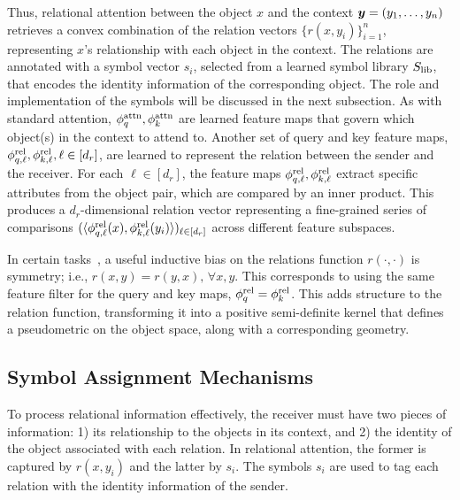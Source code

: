 
Thus, relational attention between the object $x$ and the context $\bm{y} = (y_1, \ldots, y_n)$ retrieves a convex combination of the relation vectors $\{r(x, y_i)\}_{i=1}^{n}$, representing $x$'s relationship with each object in the context. The relations are annotated with a symbol vector $s_i$, selected from a learned symbol library $S_\mathrm{lib}$, that encodes the identity information of the corresponding object. The role and implementation of the symbols will be discussed in the next subsection. As with standard attention, $\phi_q^{\mathrm{attn}}, \phi_k^{\mathrm{attn}}$ are learned feature maps that govern which object(s) in the context to attend to. Another set of query and key feature maps, $\phi_{q, \ell}^{\mathrm{rel}}, \phi_{k, \ell}^{\mathrm{rel}}, \ell \in [d_r]$, are learned to represent the relation between the sender and the receiver. For each $\ell \in [d_r]$, the feature maps $\phi_{q, \ell}^{\mathrm{rel}}, \phi_{k, \ell}^{\mathrm{rel}}$ extract specific attributes from the object pair, which are compared by an inner product. This produces a $d_r$-dimensional relation vector representing a fine-grained series of comparisons $(\langle \phi_{q, \ell}^{\mathrm{rel}}(x), \phi_{k, \ell}^{\mathrm{rel}}(y_i) \rangle)_{\ell \in [d_r]}$ across different feature subspaces.

In certain tasks~\citep{kergNeuralArchitectureInductive2022,altabaa2024abstractors,altabaaLearningHierarchicalRelational2024}, a useful inductive bias on the relations function $r(\cdot, \cdot)$ is symmetry; i.e., $r(x, y) = r(y, x),\, \forall x, y$. This corresponds to using the same feature filter for the query and key maps, $\phi_q^{\mathrm{rel}} = \phi_k^{\mathrm{rel}}$. This adds structure to the relation function, transforming it into a positive semi-definite kernel that defines a pseudometric on the object space, along with a corresponding geometry. %

\subsection{Symbol Assignment Mechanisms}

To process relational information effectively, the receiver must have two pieces of information: 1) its relationship to the objects in its context, and 2) the identity of the object associated with each relation. In relational attention, the former is captured by $r(x, y_i)$ and the latter by $s_i$.
The symbols $s_i$ are used to tag each relation with the identity information of the sender. %

